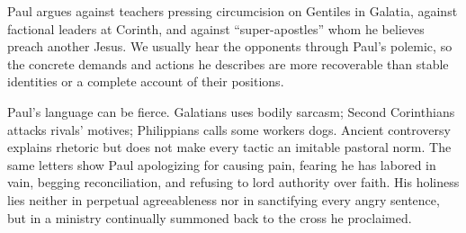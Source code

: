 Paul argues against teachers pressing circumcision on Gentiles in Galatia,
against factional leaders at Corinth, and against ``super-apostles'' whom he
believes preach another Jesus. We usually hear the opponents through Paul's
polemic, so the concrete demands and actions he describes are more recoverable
than stable identities or a complete account of their positions.

Paul's language can be fierce. Galatians uses bodily sarcasm; Second
Corinthians attacks rivals' motives; Philippians calls some workers dogs.
Ancient controversy explains rhetoric but does not make every tactic an
imitable pastoral norm. The same letters show Paul apologizing for causing
pain, fearing he has labored in vain, begging reconciliation, and refusing to
lord authority over faith. His holiness lies neither in perpetual
agreeableness nor in sanctifying every angry sentence, but in a ministry
continually summoned back to the cross he proclaimed.
